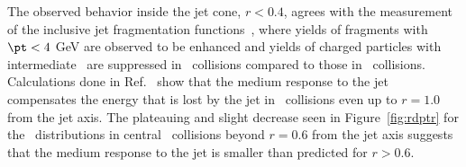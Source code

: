 The observed behavior inside the jet cone, $r < 0.4$, agrees with the measurement of the inclusive jet fragmentation functions~\cite{Aaboud:2017eww, Aaboud:2017bzv, Aaboud:2018hpb}, where yields of fragments with $\pt < 4$ GeV are observed to be enhanced and yields of charged particles with intermediate \pT\ are suppressed in \PbPb\ collisions compared to those in \pp\ collisions.
Calculations done in Ref.~\cite{Tachibana:2017syd} show that the medium response to the jet compensates the energy that is lost by the jet in \pbpb\ collisions even up to $r = 1.0$ from the jet axis.
The plateauing and slight decrease seen in Figure~\ref{fig:rdptr} for the \RDptr\ distributions in central \pbpb\ collisions beyond $r = 0.6$ from the jet axis suggests that the medium response to the jet is smaller than predicted for $r > 0.6$.


